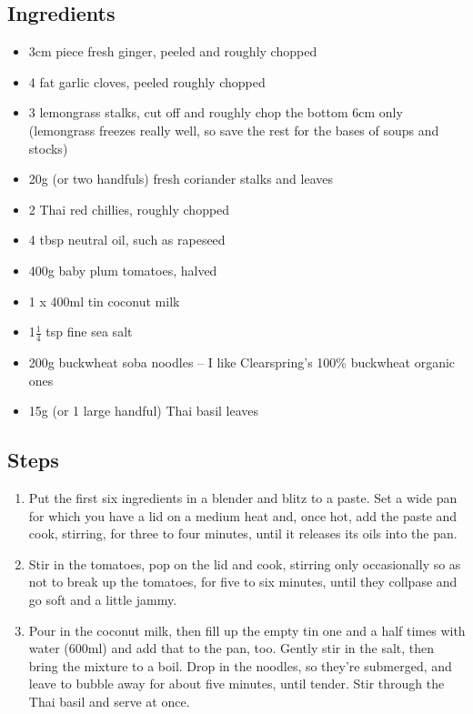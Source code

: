\documentclass{book}
\begin{document}
\subsection*{Ingredients}
\begin{itemize}
\item 3cm piece fresh ginger, peeled and roughly chopped
\item 4 fat garlic cloves, peeled roughly chopped 
\item 3 lemongrass stalks, cut off and roughly chop the bottom 6cm only (lemongrass freezes really well, so save the rest for the bases of soups and stocks)
\item 20g (or two handfuls) fresh coriander stalks and leaves 
\item 2 Thai red chillies, roughly chopped 
\item 4 tbsp neutral oil, such as rapeseed 
\item 400g baby plum tomatoes, halved
\item 1 x 400ml tin coconut milk
\item 1$\frac{1}{4}$ tsp fine sea salt 
\item 200g buckwheat soba noodles – I like Clearspring’s 100\% buckwheat organic ones
\item 15g (or 1 large handful) Thai basil leaves
\end{itemize}

\subsection*{Steps}
\begin{enumerate}
\item Put the first six ingredients in a blender and blitz to a paste. Set a wide pan for which you have a lid on a medium heat and, once hot, add the paste and cook, stirring, for three to four minutes, until it releases its oils into the pan. 
\item Stir in the tomatoes, pop on the lid and cook, stirring only occasionally so as not to break up the tomatoes, for five to six minutes, until they collpase and go soft and a little jammy.
\item Pour in the coconut milk, then fill up the empty tin one and a half times with water (600ml) and add that to the pan, too. Gently stir in the salt, then bring the mixture to a boil. Drop in the noodles, so they’re submerged, and leave to bubble away for about five minutes, until tender. Stir through the Thai basil and serve at once.
\end{enumerate}
\newpage
\end{document}
